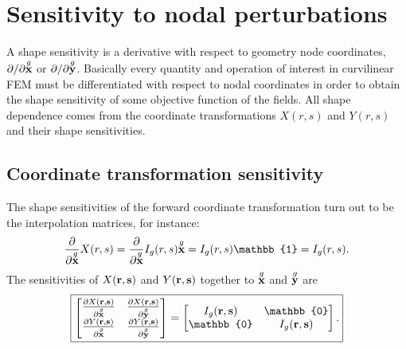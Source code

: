 \section{Sensitivity to nodal perturbations}

A shape sensitivity is a derivative with respect to geometry node coordinates, $\partial/\partial \overset{g}{\textbf{x}}$ or $\partial/\partial \overset{g}{\textbf{y}}$.  Basically every quantity and operation of interest in curvilinear FEM must be differentiated with respect to nodal coordinates in order to obtain the shape sensitivity of some objective function of the fields.  All shape dependence comes from the coordinate transformations $X(r,s)$ and $Y(r,s)$ and their shape sensitivities.

\subsection{Coordinate transformation sensitivity}
The shape sensitivities of the forward coordinate transformation turn out to be the interpolation matrices, for instance:
%
\begin{equation}
\pp{}{\g{\ve x}}X(r,s) = \pp{}{\g{\ve x}}I_g(r,s) \g{\ve x} = I_g(r,s) \mathbb{1} = I_g(r,s).
\end{equation}
%
The sensitivities of $X(\textbf{r}, \textbf{s})$ and $Y(\textbf{r}, \textbf{s})$ together to $\overset{g}{\textbf{x}}$ and $\overset{g}{\textbf{y}}$ are
%
\begin{equation}
\boxed{
\begin{bmatrix}
\pp{X(\ve r,\ve s)}{\g{\ve x}} & \pp{X(\ve r,\ve s)}{\g{\ve y}} \\
\pp{Y(\ve r,\ve s)}{\g{\ve x}} & \pp{Y(\ve r,\ve s)}{\g{\ve y}}
\end{bmatrix}
=
\begin{bmatrix}
I_g(\ve r,\ve s) & \mathbb{0} \\
\mathbb{0} & I_g(\ve r,\ve s)
\end{bmatrix}.
}%
\end{equation}

